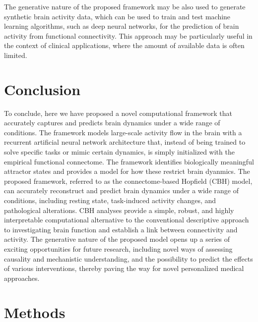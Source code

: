 \documentclass{article}
\begin{document}
The generative nature of the proposed framework may be also used to generate synthetic brain activity data, which can be used to train and test machine learning algorithms, such as deep neural networks, for the prediction of brain activity from functional connectivity. This approach may be particularly useful in the context of clinical applications, where the amount of available data is often limited.

\section{Conclusion}\label{Conclusion}

To conclude, here we have proposed a novel computational framework that accurately captures and predicts brain dynamics under a wide range of conditions.
The framework models large-scale activity flow in the brain with a recurrent artificial neural network architecture that, instead of being trained to solve specific tasks or mimic certain dynamics, is simply initialized with the empirical functional connectome. The framework identifies biologically meaningful attractor states and provides a model for how these restrict brain dyanmics.
The proposed framework, referred to as the connectome-based Hopfield (CBH) model, can accurately reconstruct and predict brain dynamics under a wide range of conditions, including resting state, task-induced activity changes, and pathological alterations.
CBH analyses provide a simple, robust, and highly interpretable computational alternative to the conventional descriptive approach to investigating brain function and establish a link between connectivity and activity.
The generative nature of the proposed model opens up a series of exciting opportunities for future research, including novel ways of assessing causality and mechanistic understanding, and the possibility to predict the effects of various interventions, thereby paving the way for novel personalized medical approaches.

\section{Methods}\label{Methods}
\end{document}
